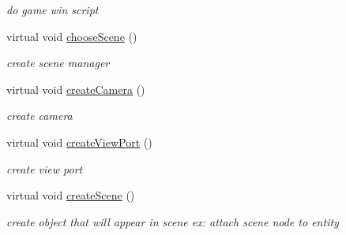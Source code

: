 \begin{DoxyCompactItemize}
\begin{DoxyCompactList}\small\item\em do game win script \end{DoxyCompactList}\item 
\hypertarget{class_stage2_a3223011df6ba53f81dbcac58d598e3b7}{
virtual void \hyperlink{class_stage2_a3223011df6ba53f81dbcac58d598e3b7}{chooseScene} ()}
\label{class_stage2_a3223011df6ba53f81dbcac58d598e3b7}

\begin{DoxyCompactList}\small\item\em create scene manager \end{DoxyCompactList}\item 
\hypertarget{class_stage2_ad66e6ad0ebe5c25ed9c918fe7d4f97b7}{
virtual void \hyperlink{class_stage2_ad66e6ad0ebe5c25ed9c918fe7d4f97b7}{createCamera} ()}
\label{class_stage2_ad66e6ad0ebe5c25ed9c918fe7d4f97b7}

\begin{DoxyCompactList}\small\item\em create camera \end{DoxyCompactList}\item 
\hypertarget{class_stage2_a347dfd97dbfc7ee66b4ba1c7c043e734}{
virtual void \hyperlink{class_stage2_a347dfd97dbfc7ee66b4ba1c7c043e734}{createViewPort} ()}
\label{class_stage2_a347dfd97dbfc7ee66b4ba1c7c043e734}

\begin{DoxyCompactList}\small\item\em create view port \end{DoxyCompactList}\item 
\hypertarget{class_stage2_ab9faf18ccf65b93fb3ce52355e9c2586}{
virtual void \hyperlink{class_stage2_ab9faf18ccf65b93fb3ce52355e9c2586}{createScene} ()}
\label{class_stage2_ab9faf18ccf65b93fb3ce52355e9c2586}

\begin{DoxyCompactList}\small\item\em create object that will appear in scene ex: attach scene node to entity \end{DoxyCompactList}\end{DoxyCompactItemize}


